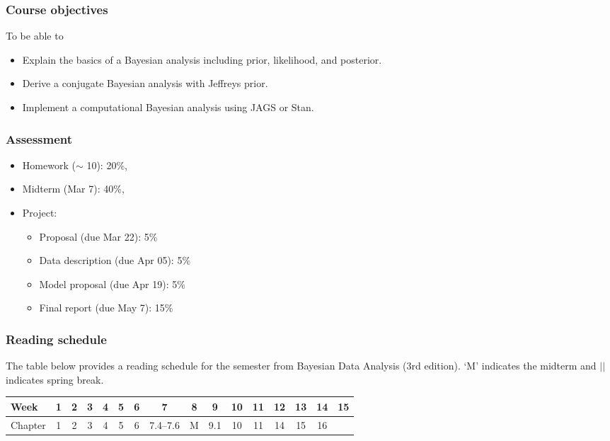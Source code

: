 \documentclass[12pt]{article}
\begin{document}
\subsubsection*{Course objectives}
To be able to 
\begin{itemize}
\item Explain the basics of a Bayesian analysis including prior, likelihood, and posterior. 
\item Derive a conjugate Bayesian analysis with Jeffreys prior.
\item Implement a computational Bayesian analysis using JAGS or Stan.
\end{itemize}

\subsubsection*{Assessment}

\begin{itemize}
\item Homework ($\sim$ 10): 20\%, 
\item Midterm (Mar 7): 40\%, 
\item Project: 
  \begin{itemize}
  \item Proposal (due Mar 22): 5\%
  \item Data description (due Apr 05): 5\%
  \item Model proposal (due Apr 19): 5\%
  \item Final report (due May 7): 15\%
  \end{itemize}
\end{itemize}

\subsubsection*{Reading schedule}

The table below provides a reading schedule for the semester from 
Bayesian Data Analysis (3rd edition).
`M' indicates the midterm and $\vert\vert$ indicates spring break. 

\vspace{0.2in} 

\begin{tabular}{|l|cccccccc||ccccccc|}
\hline
Week    & 1 & 2 & 3 & 4 & 5 & 6 & 7        & 8    & 9 & 10 & 11 & 12 & 13 & 14 & 15 \\
\hline
Chapter & 1 & 2 & 3 & 4 & 5 & 6 & 7.4--7.6 & M & 9.1 & 10 & 11 & 14 & 15 & 16 & \\
\hline
\end{tabular}
\end{document}
